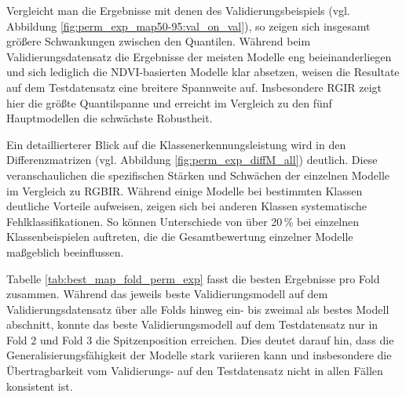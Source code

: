 Vergleicht man die Ergebnisse mit denen des Validierungsbeispiels (vgl. Abbildung \ref{fig:perm_exp_map50-95:val_on_val}), so zeigen sich insgesamt größere Schwankungen zwischen den Quantilen. Während beim Validierungsdatensatz die Ergebnisse der meisten Modelle eng beieinanderliegen und sich lediglich die NDVI-basierten Modelle klar absetzen, weisen die Resultate auf dem Testdatensatz eine breitere Spannweite auf. Insbesondere RGIR zeigt hier die größte Quantilspanne und erreicht im Vergleich zu den fünf Hauptmodellen die schwächste Robustheit.  

Ein detaillierterer Blick auf die Klassenerkennungsleistung wird in den Differenzmatrizen (vgl. Abbildung \ref{fig:perm_exp_diffM_all}) deutlich. Diese veranschaulichen die spezifischen Stärken und Schwächen der einzelnen Modelle im Vergleich zu RGBIR. Während einige Modelle bei bestimmten Klassen deutliche Vorteile aufweisen, zeigen sich bei anderen Klassen systematische Fehlklassifikationen. So können Unterschiede von über 20\,\% bei einzelnen Klassenbeispielen auftreten, die die Gesamtbewertung einzelner Modelle maßgeblich beeinflussen.  

Tabelle \ref{tab:best_map_fold_perm_exp} fasst die besten Ergebnisse pro Fold zusammen. Während das jeweils beste Validierungsmodell auf dem Validierungsdatensatz über alle Folds hinweg ein- bis zweimal als bestes Modell abschnitt, konnte das beste Validierungsmodell auf dem Testdatensatz nur in Fold 2 und Fold 3 die Spitzenposition erreichen. Dies deutet darauf hin, dass die Generalisierungsfähigkeit der Modelle stark variieren kann und insbesondere die Übertragbarkeit vom Validierungs- auf den Testdatensatz nicht in allen Fällen konsistent ist.  

